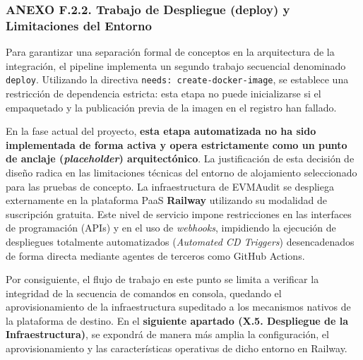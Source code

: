 \subsubsection{ANEXO F.2.2. Trabajo de Despliegue (deploy) y
Limitaciones del
Entorno}\label{anexo-f.2.2.-trabajo-de-despliegue-deploy-y-limitaciones-del-entorno}

Para garantizar una separación formal de conceptos en la arquitectura de
la integración, el pipeline implementa un segundo trabajo secuencial
denominado \texttt{deploy}. Utilizando la directiva
\texttt{needs:\ create-docker-image}, se establece una restricción de
dependencia estricta: esta etapa no puede inicializarse si el
empaquetado y la publicación previa de la imagen en el registro han
fallado.

En la fase actual del proyecto, \textbf{esta etapa automatizada no ha
sido implementada de forma activa y opera estrictamente como un punto de
anclaje (\emph{placeholder}) arquitectónico}. La justificación de esta
decisión de diseño radica en las limitaciones técnicas del entorno de
alojamiento seleccionado para las pruebas de concepto. La
infraestructura de EVMAudit se despliega externamente en la plataforma
PaaS \textbf{Railway} utilizando su modalidad de suscripción gratuita.
Este nivel de servicio impone restricciones en las interfaces de
programación (APIs) y en el uso de \emph{webhooks}, impidiendo la
ejecución de despliegues totalmente automatizados (\emph{Automated CD
Triggers}) desencadenados de forma directa mediante agentes de terceros
como GitHub Actions.

Por consiguiente, el flujo de trabajo en este punto se limita a
verificar la integridad de la secuencia de comandos en consola, quedando
el aprovisionamiento de la infraestructura supeditado a los mecanismos
nativos de la plataforma de destino. En el \textbf{siguiente apartado
(X.5. Despliegue de la Infraestructura)}, se expondrá de manera más
amplia la configuración, el aprovisionamiento y las características
operativas de dicho entorno en Railway.
